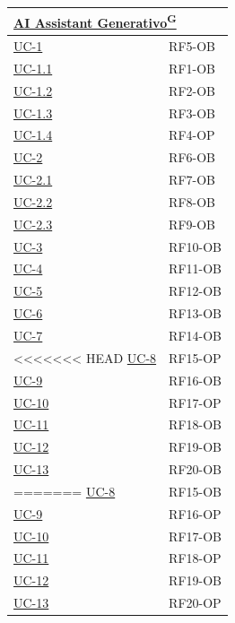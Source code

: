 ﻿\documentclass[a4paper,12pt]{article}
\providecommand{\glslink}[2]{\href{https://alittlebyte-19.github.io/Documentazione/glossario.html\#gls-#1}{\underline{#2}\textsuperscript{\scriptsize G}}}
\begin{document}
\begin{description}[style=multiline, leftmargin=4cm, font=\bfseries]
\begin{enumerate}[leftmargin=*, nosep]
{\begin{longtable}{|p{4cm}|p{4cm}|}
    \multicolumn{2}{|l|}{\cellcolor{gray!12}\textbf{\glslink{ai-assistant-generativo}{AI Assistant Generativo}}} \\
    \hline
    \hyperref[fig:uc-1]{UC-1} & RF5-OB \\
    \hline
    \hyperref[fig:uc-1.1]{UC-1.1} & RF1-OB \\
    \hline
    \hyperref[fig:uc-1.2]{UC-1.2} & RF2-OB \\
    \hline
    \hyperref[fig:uc-1.3]{UC-1.3} & RF3-OB \\
    \hline
    \hyperref[fig:uc-1.4]{UC-1.4} & RF4-OP \\
    \hline
    \hyperref[fig:uc-2]{UC-2} & RF6-OB \\
    \hline
    \hyperref[fig:uc-2.1]{UC-2.1} & RF7-OB \\
    \hline
    \hyperref[fig:uc-2.2]{UC-2.2} & RF8-OB \\
    \hline
    \hyperref[fig:uc-2.3]{UC-2.3} & RF9-OB \\
    \hline
    \hyperref[fig:uc-3]{UC-3} & RF10-OB \\
    \hline
    \hyperref[fig:uc-4]{UC-4} & RF11-OB \\
    \hline
    \hyperref[fig:uc-5]{UC-5} & RF12-OB \\
    \hline
    \hyperref[fig:uc-6]{UC-6} & RF13-OB \\
    \hline
    \hyperref[fig:uc-7]{UC-7} & RF14-OB \\
    \hline
<<<<<<< HEAD
    \hyperref[fig:uc-8]{UC-8} & RF15-OP \\
    \hline
    \hyperref[fig:uc-9]{UC-9} & RF16-OB \\
    \hline
    \hyperref[fig:uc-10]{UC-10} & RF17-OP \\
    \hline
    \hyperref[fig:uc-11]{UC-11} & RF18-OB \\
    \hline
    \hyperref[fig:uc-12]{UC-12} & RF19-OB \\
    \hline
    \hyperref[fig:uc-13]{UC-13} & RF20-OB \\
=======
    \hyperref[fig:uc-8]{UC-8} & RF15-OB \\
    \hline
    \hyperref[fig:uc-9]{UC-9} & RF16-OP \\
    \hline
    \hyperref[fig:uc-10]{UC-10} & RF17-OB \\
    \hline
    \hyperref[fig:uc-11]{UC-11} & RF18-OP \\
    \hline
    \hyperref[fig:uc-12]{UC-12} & RF19-OB \\
    \hline
    \hyperref[fig:uc-13]{UC-13} & RF20-OP \\

\end{longtable}}
\end{enumerate}
\end{description}
\end{document}
